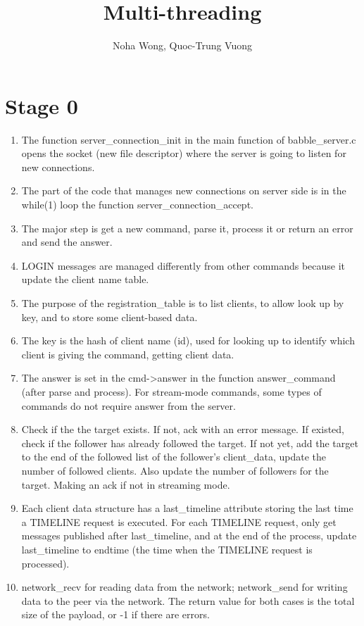\documentclass{article}
\title{Multi-threading}
\author{Noha Wong, Quoc-Trung Vuong}
\begin{document}
\maketitle
\section{Stage 0}
\begin{enumerate}
\item The function server\_connection\_init in the main function of babble\_server.c opens the socket (new file descriptor) where the server is going to listen for new connections.
\item The part of the code that manages new connections on server side is in the while(1) loop the function server\_connection\_accept.
\item The major step is get a new command, parse it, process it or return an error and send the answer.
\item LOGIN messages are managed differently from other commands because it update the client name table.
\item The purpose of the registration\_table is to list clients, to allow look up by key, and to store some client-based data.
\item The key is the hash of client name (id), used for looking up to identify which client is giving the command, getting client data.
\item The answer is set in the cmd->answer in the function answer\_command (after parse and process). For stream-mode commands, some types of commands do not require answer from the server.
\item Check if the the target exists. If not, ack with an error message. If existed, check if the follower has already followed the target. If not yet, add the target to the end of the followed list of the follower's client\_data, update the number of followed clients. Also update the number of followers for the target. Making an ack if not in streaming mode.
\item Each client data structure has a last\_timeline attribute storing the last time a TIMELINE request is executed. For each TIMELINE request, only get messages published after last\_timeline, and at the end of the process, update last\_timeline to endtime (the time when the TIMELINE request is processed).
\item network\_recv for reading data from the network; network\_send for writing data to the peer via the network. The return value for both cases is the total size of the payload, or -1 if there are errors.

\end{enumerate}
\end{document}
